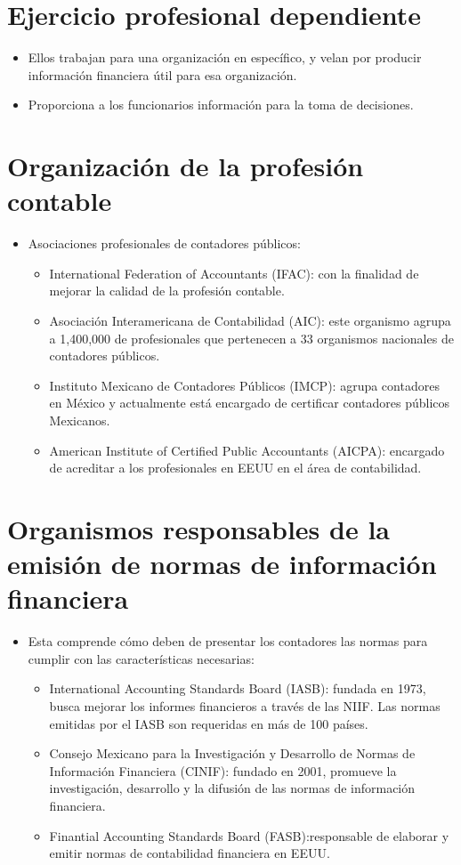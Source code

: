 \documentclass{article}
\begin{document}
\section{Ejercicio profesional dependiente}
\begin{itemize}
    \item Ellos trabajan para una organización en específico, y velan por producir información financiera útil para esa organización.
    \item Proporciona a los funcionarios información para la toma de decisiones.
\end{itemize}

\section{Organización de la profesión contable}
\begin{itemize}
    \item Asociaciones profesionales de contadores públicos:
    \begin{itemize}
        \item International Federation of Accountants (IFAC): con la finalidad de mejorar la calidad de la profesión contable.
        \item Asociación Interamericana de Contabilidad (AIC): este organismo agrupa a 1,400,000 de profesionales que pertenecen a 33 organismos nacionales de contadores públicos.
        \item Instituto Mexicano de Contadores Públicos (IMCP): agrupa contadores en México y actualmente está encargado de certificar contadores públicos Mexicanos.
        \item American Institute of Certified Public Accountants (AICPA): encargado de acreditar a los profesionales en EEUU en el área de contabilidad.
    \end{itemize}
\end{itemize}

\section{Organismos responsables de la emisión de normas de información financiera}
\begin{itemize}
    \item Esta comprende cómo deben de presentar los contadores las normas para cumplir con las características necesarias:
    \begin{itemize}
        \item International Accounting Standards Board (IASB): fundada en 1973, busca mejorar los informes financieros a través de las NIIF. Las normas emitidas por el IASB son requeridas en más de 100 países.
        \item Consejo Mexicano para la Investigación y Desarrollo de Normas de Información Financiera (CINIF): fundado en 2001, promueve la investigación, desarrollo y la difusión de las normas de información financiera.
        \item Finantial Accounting Standards Board (FASB):responsable de elaborar y emitir normas de contabilidad financiera en EEUU.
    \end{itemize}
\end{itemize}
\end{document}
